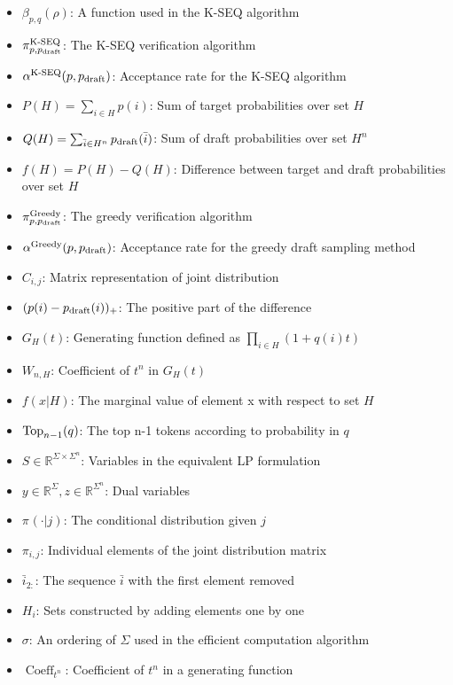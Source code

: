 \documentclass{article}
\begin{document}
\begin{itemize}
\item $\beta_{p,q}(\rho)$: A function used in the K-SEQ algorithm
\item $\pi^{\operatorname{K-SEQ}}_{p,p_{\operatorname{draft}}}$: The K-SEQ verification algorithm
\item $\alpha^{\operatorname{K-SEQ}}(p,p_{\operatorname{draft}})$: Acceptance rate for the K-SEQ algorithm
\item $P(H)=\sum_{i\in H} p(i)$: Sum of target probabilities over set $H$
\item $Q(H)=\sum_{\bar{i}\in H^n} p_{\operatorname{draft}}(\bar{i})$: Sum of draft probabilities over set $H^n$
\item $f(H)=P(H)-Q(H)$: Difference between target and draft probabilities over set $H$
\item $\pi^{\operatorname{Greedy}}_{p,p_{\operatorname{draft}}}$: The greedy verification algorithm
\item $\alpha^{\operatorname{Greedy}}(p,p_{\operatorname{draft}})$: Acceptance rate for the greedy draft sampling method
\item $C_{i,j}$: Matrix representation of joint distribution
\item $(p(i)-p_{\operatorname{draft}}(i))_+$: The positive part of the difference
\item $G_H(t)$: Generating function defined as $\prod_{i\in H}(1+q(i)t)$
\item $W_{n,H}$: Coefficient of $t^n$ in $G_H(t)$
\item $f(x|H)$: The marginal value of element x with respect to set $H$
\item $\operatorname{Top}_{n-1}(q)$: The top n-1 tokens according to probability in $q$
\item $S \in \mathbb{R}^{\Sigma \times \Sigma^n}$: Variables in the equivalent LP formulation
\item $y \in \mathbb{R}^{\Sigma}, z \in \mathbb{R}^{\Sigma^n}$: Dual variables
\item $\pi_{}(\cdot|j)$: The conditional distribution given $j$
\item $\pi_{i,j}$: Individual elements of the joint distribution matrix
\item $\bar{i}_{2:}$: The sequence $\bar{i}$ with the first element removed
\item $H_i$: Sets constructed by adding elements one by one
\item $\sigma$: An ordering of $\Sigma$ used in the efficient computation algorithm
\item $\operatorname{Coeff}_{t^n}$: Coefficient of $t^n$ in a generating function
\end{itemize}
\end{document}
